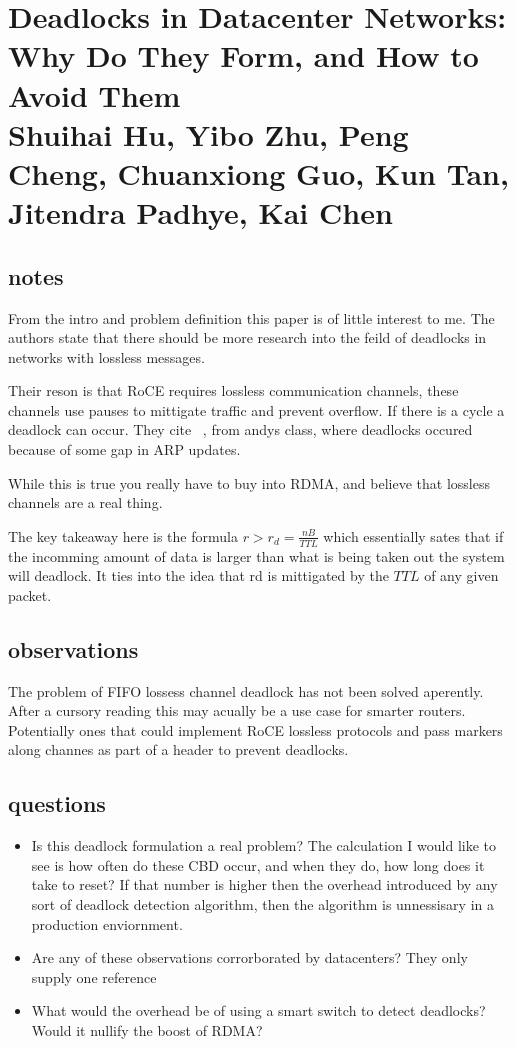 \section{Deadlocks in Datacenter Networks: Why Do They Form, and How to Avoid Them \\ \small{Shuihai Hu, Yibo Zhu, Peng Cheng, Chuanxiong Guo, Kun Tan, Jitendra Padhye, Kai Chen}}

\subsection{notes}

From the intro and problem definition this paper is of little interest to me.
The authors state that there should be more research into the feild of
deadlocks in networks with lossless messages.

Their reson is that RoCE requires lossless communication channels, these
channels use pauses to mittigate traffic and prevent overflow. If there is a
cycle a deadlock can occur. They cite ~\cite{rdma-commodity-ethernet-scale},
from andys class, where deadlocks occured because of some gap in ARP updates.

While this is true you really have to buy into RDMA, and believe that lossless
channels are a real thing.

The key takeaway here is the formula $r > r_d = \frac{nB}{TTL}$ which
essentially sates that if the incomming amount of data is larger than what is
being taken out the system will deadlock. It ties into the idea that rd is
mittigated by the $TTL$ of any given packet.

\subsection{observations}

The problem of FIFO lossess channel deadlock has not been solved aperently.
After a cursory reading this may acually be a use case for smarter routers.
Potentially ones that could implement RoCE lossless protocols and pass markers
along channes as part of a header to prevent deadlocks.

\subsection{questions}

\begin{itemize}

\item Is this deadlock formulation a real problem? The calculation I would like
to see is how often do these CBD occur, and when they do, how long does it take
to reset? If that number is higher then the overhead introduced by any sort of
deadlock detection algorithm, then the algorithm is unnessisary in a production
enviornment.

\item Are any of these observations corrorborated by datacenters? They only
supply one reference

\item What would the overhead be of using a smart switch to detect deadlocks?
Would it nullify the boost of RDMA?

\end{itemize}
